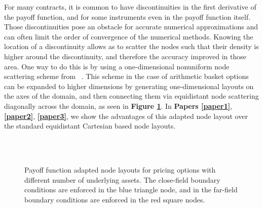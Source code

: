 \documentclass{UUThesisTemplate}
\begin{document}
\par
For many contracts, it is common to have discontinuities in the first derivative of the payoff function, and for some instruments even in the payoff function itself. Those discontinuities pose an obstacle for accurate numerical approximations and can often limit the order of convergence of the numerical methods. Knowing the location of a discontinuity allows as to scatter the nodes such that their density is higher around the discontinuity, and therefore the accuracy improved in those area. One way to do this is by using a one-dimensional nonuniform node scattering scheme from ~\cite{foulon2010adi}. This scheme in the case of arithmetic basket options can be expanded to higher dimensions by generating one-dimensional layouts on the axes of the domain, and then connecting them via equidistant node scattering diagonally across the domain, as seen in \textbf{Figure \ref{fig:gridadap}}. In \textbf{Papers \ref{paper1}}, \textbf{\ref{paper2}}, \textbf{\ref{paper3}}, we show the advantages of this adapted node layout over the standard equidistant Cartesian based node layouts.   

\begin{figure}[H]
\centering
\\
\vspace{11pt}
\\
\caption{Payoff function adapted node layouts for pricing options with different number of underlying assets. The close-field boundary conditions are enforced in the blue triangle node, and in the far-field boundary conditions are enforced in the red square nodes.}
\label{fig:gridadap}
\end{figure}
\end{document}
